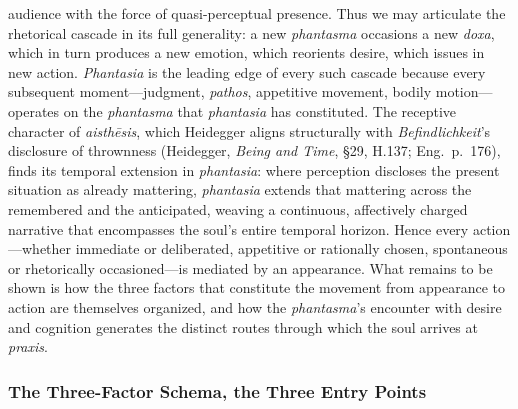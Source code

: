 \documentclass{article}
\begin{document}
audience with the force of quasi-perceptual presence. Thus we may articulate the rhetorical cascade in its full generality: a new \textit{phantasma} occasions a new \textit{doxa}, which in turn produces a new emotion, which reorients desire, which issues in new action. \textit{Phantasia} is the leading edge of every such cascade because every subsequent moment---judgment, \textit{pathos}, appetitive movement, bodily motion---operates on the \textit{phantasma} that \textit{phantasia} has constituted. The receptive character of \textit{aisth\={e}sis}, which Heidegger aligns structurally with \textit{Befindlichkeit}'s disclosure of thrownness (Heidegger, \textit{Being and Time}, \S29, H.137; Eng.~p.~176), finds its temporal extension in \textit{phantasia}: where perception discloses the present situation as already mattering, \textit{phantasia} extends that mattering across the remembered and the anticipated, weaving a continuous, affectively charged narrative that encompasses the soul's entire temporal horizon. Hence every action---whether immediate or deliberated, appetitive or rationally chosen, spontaneous or rhetorically occasioned---is mediated by an appearance. What remains to be shown is how the three factors that constitute the movement from appearance to action are themselves organized, and how the \textit{phantasma}'s encounter with desire and cognition generates the distinct routes through which the soul arrives at \textit{praxis}.


\subsubsection*{The Three-Factor Schema, the Three Entry Points}
\end{document}

